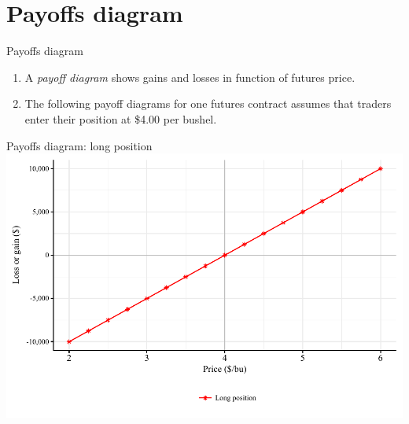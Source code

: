 \documentclass[table,xcolor=pdftex,dvipsnames]{beamer}\usepackage[]{graphicx}\usepackage[]{color}
\makeatletter
\def\maxwidth{ %
  \ifdim\Gin@nat@width>\linewidth
    \linewidth
  \else
    \Gin@nat@width
  \fi
}
\newenvironment{knitrout}{}{} %
\makeatother
\begin{document}
\section{Payoffs diagram}


\begin{frame}{Payoffs diagram}
\begin{enumerate}[label=\textbullet]
      \item A \emph{payoff diagram} shows gains and losses in function of futures price.
      \item The following payoff diagrams for one futures contract assumes that traders enter their position at \$4.00 per bushel.
\end{enumerate}
\end{frame}





\begin{frame}{Payoffs diagram: long position}
\begin{knitrout}
\color{fgcolor}
\includegraphics[width=\maxwidth]{figure/figure_long-1} 

\end{knitrout}
\end{frame}

\end{document}
